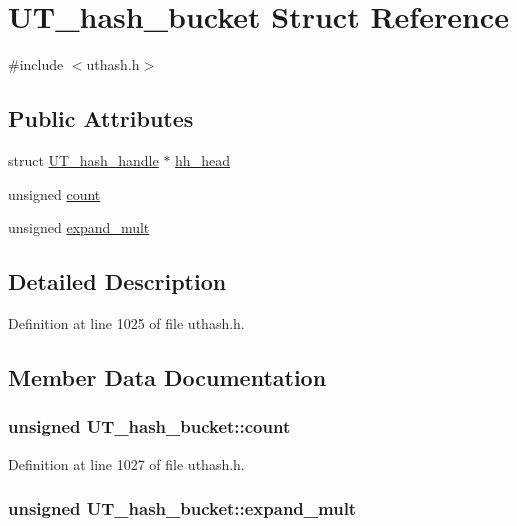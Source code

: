 \hypertarget{struct_u_t__hash__bucket}{\section{U\-T\-\_\-hash\-\_\-bucket Struct Reference}
\label{struct_u_t__hash__bucket}
}


{\ttfamily \#include $<$uthash.\-h$>$}

\subsection*{Public Attributes}
\begin{DoxyCompactItemize}
\item 
struct \hyperlink{struct_u_t__hash__handle}{U\-T\-\_\-hash\-\_\-handle} $\ast$ \hyperlink{struct_u_t__hash__bucket_aff0ef60d2d1fabbfdd092b1ae9d00422}{hh\-\_\-head}
\item 
unsigned \hyperlink{struct_u_t__hash__bucket_a5d20cc12bdcbde360398910eefb45634}{count}
\item 
unsigned \hyperlink{struct_u_t__hash__bucket_a9b739c1b69c141e8198c0c64af643b2b}{expand\-\_\-mult}
\end{DoxyCompactItemize}


\subsection{Detailed Description}


Definition at line 1025 of file uthash.\-h.



\subsection{Member Data Documentation}
\hypertarget{struct_u_t__hash__bucket_a5d20cc12bdcbde360398910eefb45634}{
\subsubsection[{count}]{\setlength{\rightskip}{0pt plus 5cm}unsigned U\-T\-\_\-hash\-\_\-bucket\-::count}}\label{struct_u_t__hash__bucket_a5d20cc12bdcbde360398910eefb45634}


Definition at line 1027 of file uthash.\-h.

\hypertarget{struct_u_t__hash__bucket_a9b739c1b69c141e8198c0c64af643b2b}{
\subsubsection[{expand\-\_\-mult}]{\setlength{\rightskip}{0pt plus 5cm}unsigned U\-T\-\_\-hash\-\_\-bucket\-::expand\-\_\-mult}}\label{struct_u_t__hash__bucket_a9b739c1b69c141e8198c0c64af643b2b}


